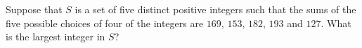 Suppose that $S$ is a set of five distinct positive integers such that the sums of the five possible choices of four of the integers are $169$, $153$, $182$, $193$ and $127$. What is the largest integer in $S$?
